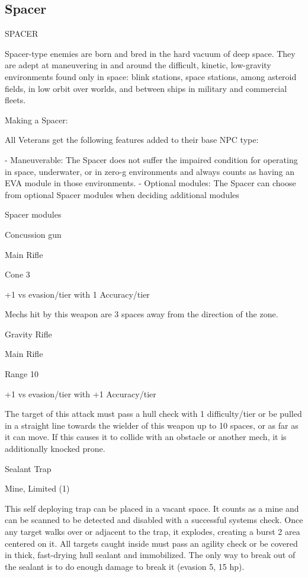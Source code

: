 \subsection{Spacer}
                                                 SPACER

Spacer-type enemies are born and bred in the hard vacuum of deep space. They are adept at
maneuvering in and around the difficult, kinetic, low-gravity environments found only in space:
blink stations, space stations, among asteroid fields, in low orbit over worlds, and between ships
in military and commercial fleets.

Making a Spacer:

All Veterans get the following features added to their base NPC type:

    -    Maneuverable: The Spacer does not suffer the impaired condition for operating in space,
         underwater, or in zero-g environments and always counts as having an EVA module in
        those environments.
    -   Optional modules: The Spacer can choose from optional Spacer modules when
        deciding additional modules

Spacer modules

Concussion gun





Main Rifle

Cone 3

+1 vs evasion/tier with 1 Accuracy/tier

Mechs hit by this weapon are 3 spaces away from the direction of the zone.


Gravity Rifle

Main Rifle

Range 10

+1 vs evasion/tier with +1 Accuracy/tier

The target of this attack must pass a hull check with 1 difficulty/tier or be pulled in a straight line
towards the wielder of this weapon up to 10 spaces, or as far as it can move. If this causes it to
collide with an obstacle or another mech, it is additionally knocked prone.


Sealant Trap

Mine, Limited (1)

This self deploying trap can be placed in a vacant space. It counts as a mine and can be
scanned to be detected and disabled with a successful systems check. Once any target walks
over or adjacent to the trap, it explodes, creating a burst 2 area centered on it. All targets caught
inside must pass an agility check or be covered in thick, fast-drying hull sealant and immobilized.
The only way to break out of the sealant is to do enough damage to break it (evasion 5, 15 hp).



